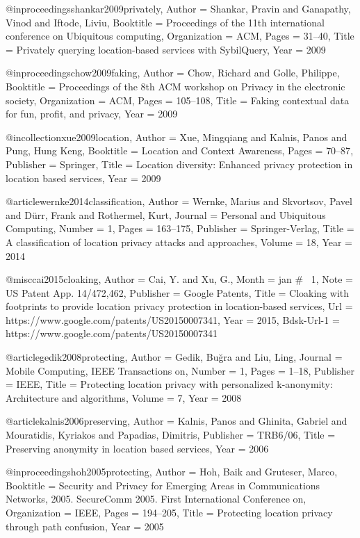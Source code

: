 {{{{{	@inproceedings{shankar2009privately,
	Author = {Shankar, Pravin and Ganapathy, Vinod and Iftode, Liviu},
	Booktitle = {Proceedings of the 11th international conference on Ubiquitous computing},
	Organization = {ACM},
	Pages = {31--40},
	Title = {Privately querying location-based services with SybilQuery},
	Year = {2009}}
	
	@inproceedings{chow2009faking,
	Author = {Chow, Richard and Golle, Philippe},
	Booktitle = {Proceedings of the 8th ACM workshop on Privacy in the electronic society},
	Organization = {ACM},
	Pages = {105--108},
	Title = {Faking contextual data for fun, profit, and privacy},
	Year = {2009}}
	
	@incollection{xue2009location,
	Author = {Xue, Mingqiang and Kalnis, Panos and Pung, Hung Keng},
	Booktitle = {Location and Context Awareness},
	Pages = {70--87},
	Publisher = {Springer},
	Title = {Location diversity: Enhanced privacy protection in location based services},
	Year = {2009}}
	
	@article{wernke2014classification,
	Author = {Wernke, Marius and Skvortsov, Pavel and D{\"u}rr, Frank and Rothermel, Kurt},
	Journal = {Personal and Ubiquitous Computing},
	Number = {1},
	Pages = {163--175},
	Publisher = {Springer-Verlag},
	Title = {A classification of location privacy attacks and approaches},
	Volume = {18},
	Year = {2014}}
	
	@misc{cai2015cloaking,
	Author = {Cai, Y. and Xu, G.},
	Month = jan # {~1},
	Note = {US Patent App. 14/472,462},
	Publisher = {Google Patents},
	Title = {Cloaking with footprints to provide location privacy protection in location-based services},
	Url = {https://www.google.com/patents/US20150007341},
	Year = {2015},
	Bdsk-Url-1 = {https://www.google.com/patents/US20150007341}}
	
	@article{gedik2008protecting,
	Author = {Gedik, Bu{\u{g}}ra and Liu, Ling},
	Journal = {Mobile Computing, IEEE Transactions on},
	Number = {1},
	Pages = {1--18},
	Publisher = {IEEE},
	Title = {Protecting location privacy with personalized k-anonymity: Architecture and algorithms},
	Volume = {7},
	Year = {2008}}
	
	@article{kalnis2006preserving,
	Author = {Kalnis, Panos and Ghinita, Gabriel and Mouratidis, Kyriakos and Papadias, Dimitris},
	Publisher = {TRB6/06},
	Title = {Preserving anonymity in location based services},
	Year = {2006}}
	
	@inproceedings{hoh2005protecting,
	Author = {Hoh, Baik and Gruteser, Marco},
	Booktitle = {Security and Privacy for Emerging Areas in Communications Networks, 2005. SecureComm 2005. First International Conference on},
	Organization = {IEEE},
	Pages = {194--205},
	Title = {Protecting location privacy through path confusion},
	Year = {2005}}
	
}}}}}
